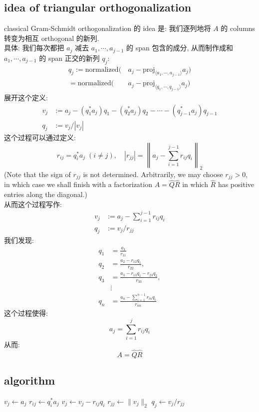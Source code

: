 \subsection{idea of triangular orthogonalization}
classical Gram-Schmidt orthogonalization 的 idea 是: 我们逐列地将 $A$ 的 columns 转变为相互 orthogonal 的新列.\\
具体: 我们每次都把 $a_j$ 减去 $a_1,\cdots, a_{j-1}$ 的 span 包含的成分, 从而制作成和  $a_1,\cdots, a_{j-1}$ 的 span 正交的新列 $q_j$: 
\begin{align*}
q_j := \text{normalized} (& \,a_j - \text{proj}_ {\langle a_1,\cdots,a_{j-1} \rangle} a_j) \\
=  \text{normalized} (& \,a_j- \text{proj}_ {\langle q_1,\cdots,q_{j-1} \rangle} a_j)
\end{align*}
展开这个定义: 
\begin{align*}
v_j&:=a_j-\left(q_1^* a_j\right) q_1-\left(q_2^* a_j\right) q_2-\cdots-\left(q_{j-1}^* a_j\right) q_{j-1}\\
    q_j  &:= v_j / |v_j|  
\end{align*}
这个过程可以通过定义: 
$$
r_{i j}=q_i^* a_j \;(i \neq j), \quad   \left|r_{j j}\right|=\left\|a_j-\sum_{i=1}^{j-1} r_{i j} q_i\right\|_2
$$
(Note that the sign of $r_{j j}$ is not determined. Arbitrarily, we may choose $r_{j j}>0$, in which case we shall finish with a factorization $A=\hat{Q} \hat{R}$ in which $\hat{R}$ has positive entries along the diagonal.)\\
从而这个过程写作: 
\begin{align*}
v_j &:=a_j -  \sum_{i=1}^{j-1} r_{i j} q_i    \\
q_j  &:= v_j / r_{jj}  
\end{align*}
我们发现:
$$
\begin{aligned}
q_1 & =\frac{a_1}{r_{11}} \\
q_2 & =\frac{a_2-r_{12} q_1}{r_{22}}, \\
q_3 & =\frac{a_3-r_{13} q_1-r_{23} q_2}{r_{33}}, \\
& \vdots \\
q_n & =\frac{a_n-\sum_{i=1}^{n-1} r_{i n} q_i}{r_{n n}}
\end{aligned}
$$
这个过程使得: 
\[
a_j = \sum_{i=1}^j r_{ij} q_i
\]从而:
\[
A  = \hat{Q} \hat{R}
\]

\subsection{algorithm}


\begin{algorithm}
\caption{Classical Gram-Schmidt (unstable)}
\begin{algorithmic}[1]
    \STATE $v_j \gets a_j$
        \STATE $r_{ij} \gets q_i^* a_j$
        \STATE $v_j \gets v_j - r_{ij} q_i$
    \ENDFOR
    \STATE $r_{jj} \gets \|v_j\|_2$
    \STATE $q_j \gets v_j / r_{jj}$
\ENDFOR
\end{algorithmic}
\end{algorithm}





